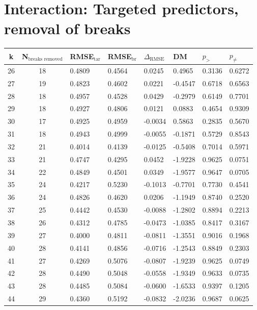 \documentclass[12pt]{article}
\begin{document}
\section{Interaction: Targeted predictors, removal of breaks}
\begin{table}[htp]
	\centering
	\begin{tabular}{cc|lll|lll}
		k & N$_{\text{breaks removed}}$ & RMSE$_{\text{tar}}$ & RMSE$_{\text{br}}$ & $\Delta_{\text{RMSE}}$ & DM & $p_>$ & $p_{\not =}$ \\
		\hline
			26 & 18 & 0.4809 & 0.4564 & 0.0245 & 0.4965 & 0.3136 & 0.6272 \\
			27 & 19 & 0.4823 & 0.4602 & 0.0221 & -0.4547 & 0.6718 & 0.6563 \\
			28 & 18 & 0.4957 & 0.4528 & 0.0429 & -0.2979 & 0.6149 & 0.7701 \\
			29 & 18 & 0.4927 & 0.4806 & 0.0121 & 0.0883 & 0.4654 & 0.9309 \\
			30 & 17 & 0.4925 & 0.4959 & -0.0034 & 0.5863 & 0.2835 & 0.5670 \\
			31 & 18 & 0.4943 & 0.4999 & -0.0055 & -0.1871 & 0.5729 & 0.8543 \\
			32 & 21 & 0.4014 & 0.4139 & -0.0125 & -0.5408 & 0.7014 & 0.5971 \\
			33 & 21 & 0.4747 & 0.4295 & 0.0452 & -1.9228 & 0.9625 & 0.0751 \\
			34 & 22 & 0.4849 & 0.4501 & 0.0349 & -1.9577 & 0.9647 & 0.0705 \\
			35 & 24 & 0.4217 & 0.5230 & -0.1013 & -0.7701 & 0.7730 & 0.4541 \\
			36 & 24 & 0.4826 & 0.4620 & 0.0206 & -1.1949 & 0.8740 & 0.2520 \\
			37 & 25 & 0.4442 & 0.4530 & -0.0088 & -1.2802 & 0.8894 & 0.2213 \\
			38 & 26 & 0.4312 & 0.4785 & -0.0473 & -1.0385 & 0.8417 & 0.3167 \\
			39 & 27 & 0.4000 & 0.4811 & -0.0811 & -1.3551 & 0.9016 & 0.1968 \\
			40 & 28 & 0.4141 & 0.4856 & -0.0716 & -1.2543 & 0.8849 & 0.2303 \\
			41 & 27 & 0.4269 & 0.5076 & -0.0807 & -1.9239 & 0.9625 & 0.0749 \\
			42 & 28 & 0.4490 & 0.5048 & -0.0558 & -1.9349 & 0.9633 & 0.0735 \\
			43 & 28 & 0.4485 & 0.5084 & -0.0600 & -1.6533 & 0.9397 & 0.1205 \\
			44 & 29 & 0.4360 & 0.5192 & -0.0832 & -2.0236 & 0.9687 & 0.0625 \\

\end{tabular}
\end{table}
\end{document}
